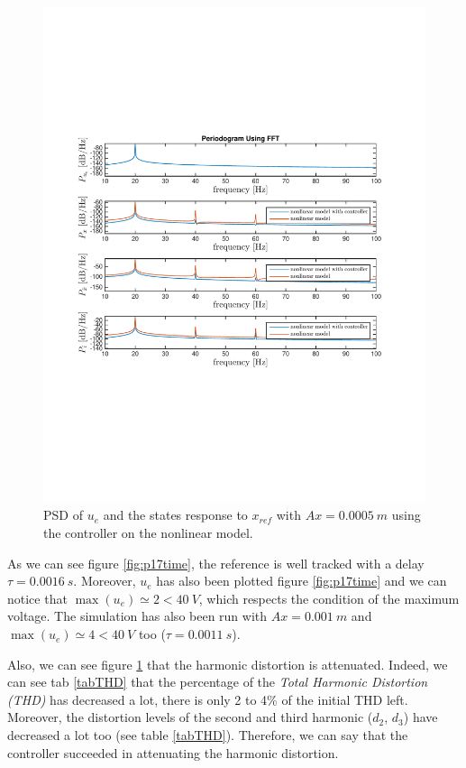 \begin{figure}[H]
 \centering 
 \includegraphics[trim=0cm 7cm 0cm 7cm, clip=true, totalheight=0.35\textheight, angle=0]{figures/p17freq.pdf}
 \caption{PSD of $u_e$ and the states response to $x_{ref}$ with $Ax = 0.0005\ m$ using the controller on the nonlinear model.}
 \label{fig:p17freq}
\end{figure}

As we can see figure \ref{fig:p17time}, the reference is well tracked with a delay $\tau = 0.0016\ s$. Moreover, $u_e$ has also been plotted figure \ref{fig:p17time} and we can notice that $\max(u_e) \simeq 2 < 40\ V$, which respects the condition of the maximum voltage. The simulation has also been run with $Ax = 0.001\ m$ and $\max(u_e) \simeq 4 < 40\ V$ too ($\tau = 0.0011\ s$).

Also, we can see figure \ref{fig:p17freq} that the harmonic distortion is attenuated. Indeed, we can see tab \ref{tabTHD} that the percentage of the \textit{Total Harmonic Distortion (THD)} has decreased a lot, there is only 2 to 4\% of the initial THD left. Moreover, the distortion levels of the second and third harmonic ($d_2$, $d_3$) have decreased a lot too (see table \ref{tabTHD}). Therefore, we can say that the controller succeeded in attenuating the harmonic distortion.

